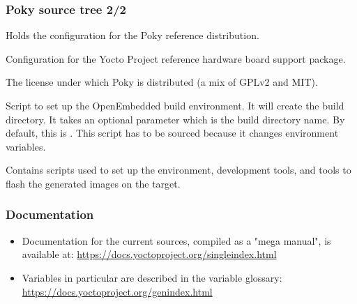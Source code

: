 \begin{frame}
  \frametitle{Poky source tree 2/2}
  \begin{description}[style=nextline]
  \item[meta-poky/] Holds the configuration for the Poky
    reference distribution.
  \item[meta-yocto-bsp/] Configuration for the Yocto Project
    reference hardware board support package.
  \item[LICENSE] The license under which Poky is distributed (a mix of
    GPLv2 and MIT).
  \item[oe-init-build-env] Script to set up the OpenEmbedded build
    environment. It will create the build directory. It takes an optional
    parameter which is the build directory name. By default, this is
    . This script has to be sourced because it changes
    environment variables.
  \item[scripts] Contains scripts used to set up the environment,
    development tools, and tools to flash the generated images on the
    target.
  \end{description}
\end{frame}

\begin{frame}
  \frametitle{Documentation}
  \begin{itemize}
    \item Documentation for the current sources, compiled as a "mega
      manual", is available at:
      \url{https://docs.yoctoproject.org/singleindex.html}
    \item Variables in particular are described in the variable
      glossary:
      \url{https://docs.yoctoproject.org/genindex.html}
  \end{itemize}
\end{frame}
